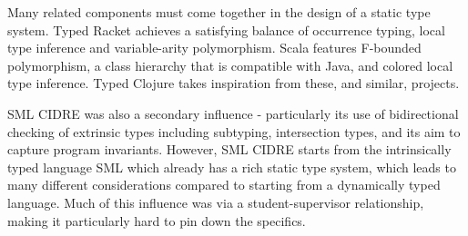 Many related components must come together in the design of a
static type system. Typed Racket achieves a satisfying balance of 
occurrence typing, local type inference and variable-arity polymorphism.
Scala features F-bounded polymorphism, a class hierarchy
that is compatible with Java, and colored local type inference.
Typed Clojure takes inspiration from these, and similar, projects.

SML CIDRE \cite{Dav05} was also a secondary influence - particularly its use of bidirectional 
checking of extrinsic types including subtyping, intersection types, and its aim to capture program invariants.  
However, SML CIDRE starts from the intrinsically typed language SML which already has a rich static 
type system, which leads to many different considerations compared to starting from a dynamically typed language.  
Much of this influence was via a student-supervisor relationship, making it particularly hard to pin down the specifics.
